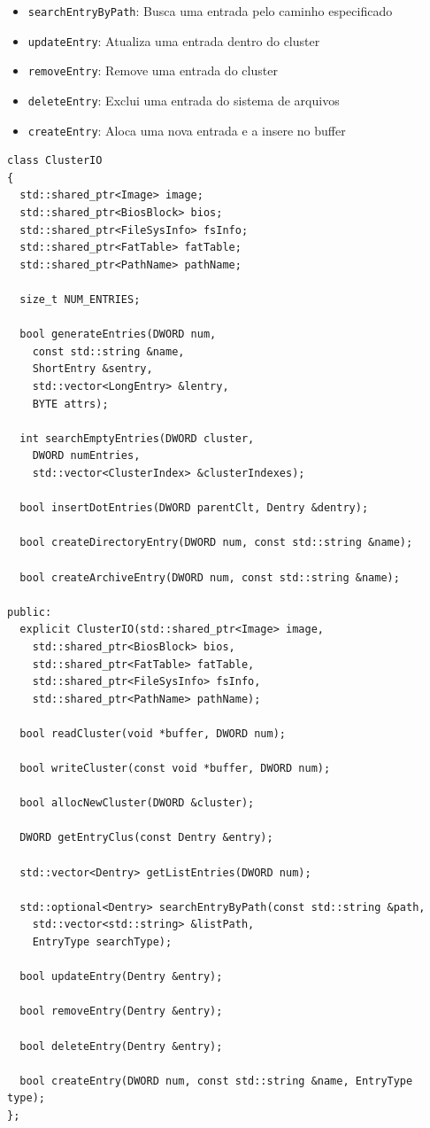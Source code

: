 \documentclass[
    12pt,				%
    oneside,   	        %
    a4paper,			%
    english,			%
    french,				%
    spanish,			%
    brazil,				%
    ]{pacotes/abntex2}
\begin{document}
\begin{itemize}
\begin{itemize}
            \item \texttt{searchEntryByPath}: Busca uma entrada pelo caminho especificado
            \item \texttt{updateEntry}: Atualiza uma entrada dentro do cluster
            \item \texttt{removeEntry}: Remove uma entrada do cluster
            \item \texttt{deleteEntry}: Exclui uma entrada do sistema de arquivos
            \item \texttt{createEntry}: Aloca uma nova entrada e a insere no buffer
        \end{itemize}
\end{itemize}


\begin{lstlisting}[caption={Classe de abstração dos clusters do sistema}, label={lst:cluster_io}]
class ClusterIO
{
  std::shared_ptr<Image> image;
  std::shared_ptr<BiosBlock> bios;
  std::shared_ptr<FileSysInfo> fsInfo;
  std::shared_ptr<FatTable> fatTable;
  std::shared_ptr<PathName> pathName;
  
  size_t NUM_ENTRIES;

  bool generateEntries(DWORD num,
    const std::string &name,
    ShortEntry &sentry,
    std::vector<LongEntry> &lentry,
    BYTE attrs);

  int searchEmptyEntries(DWORD cluster,
    DWORD numEntries,
    std::vector<ClusterIndex> &clusterIndexes);

  bool insertDotEntries(DWORD parentClt, Dentry &dentry);

  bool createDirectoryEntry(DWORD num, const std::string &name);

  bool createArchiveEntry(DWORD num, const std::string &name);

public:
  explicit ClusterIO(std::shared_ptr<Image> image,
    std::shared_ptr<BiosBlock> bios,
    std::shared_ptr<FatTable> fatTable,
    std::shared_ptr<FileSysInfo> fsInfo,
    std::shared_ptr<PathName> pathName);
    
  bool readCluster(void *buffer, DWORD num);

  bool writeCluster(const void *buffer, DWORD num);

  bool allocNewCluster(DWORD &cluster);

  DWORD getEntryClus(const Dentry &entry);

  std::vector<Dentry> getListEntries(DWORD num);

  std::optional<Dentry> searchEntryByPath(const std::string &path,
    std::vector<std::string> &listPath,
    EntryType searchType);

  bool updateEntry(Dentry &entry);

  bool removeEntry(Dentry &entry);

  bool deleteEntry(Dentry &entry);

  bool createEntry(DWORD num, const std::string &name, EntryType type);
};
\end{lstlisting}
\end{document}
